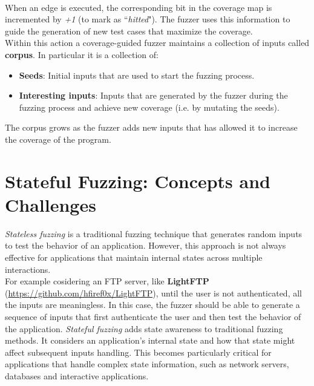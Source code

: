 \phantom{}\\
When an edge is executed, the corresponding bit in the coverage map is incremented by \textit{+1} (to mark as ``\textit{hitted}"). The fuzzer uses this information to guide the generation of new test cases that maximize the coverage.
\\Within this action a coverage-guided fuzzer maintains a collection of inputs called \textbf{corpus}. In particular it is a collection of:
\begin{itemize}
    \item \textbf{Seeds}: Initial inputs that are used to start the fuzzing process.
    \item \textbf{Interesting inputs}: Inputs that are generated by the fuzzer during the fuzzing process and achieve new coverage (i.e. by mutating the seeds).
\end{itemize}
The corpus grows as the fuzzer adds new inputs that has allowed it to increase the coverage of the program.

\section{Stateful Fuzzing: Concepts and Challenges}
\textit{Stateless fuzzing} is a traditional fuzzing technique that generates random inputs to test the behavior of an application. However, this approach is not always effective for applications that maintain internal states across multiple interactions.
\\For example cosidering an FTP server, like \textbf{LightFTP} (\href{https://github.com/hfiref0x/LightFTP}{https://github.com/hfiref0x/LightFTP}), until the user is not authenticated, all the inputs are meaningless. In this case, the fuzzer should be able to generate a sequence of inputs that first authenticate the user and then test the behavior of the application.
\textit{Stateful fuzzing} adds state awareness to traditional fuzzing methods. It considers an application's internal state and how that state might affect subsequent inputs handling. This becomes particularly critical for applications that handle complex state information, such as network servers, databases and interactive applications.

